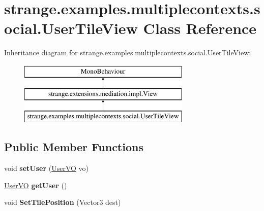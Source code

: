 \hypertarget{classstrange_1_1examples_1_1multiplecontexts_1_1social_1_1_user_tile_view}{\section{strange.\-examples.\-multiplecontexts.\-social.\-User\-Tile\-View Class Reference}
\label{classstrange_1_1examples_1_1multiplecontexts_1_1social_1_1_user_tile_view}
}
Inheritance diagram for strange.\-examples.\-multiplecontexts.\-social.\-User\-Tile\-View\-:\begin{figure}[H]
\begin{center}
\leavevmode
\includegraphics[height=3.000000cm]{classstrange_1_1examples_1_1multiplecontexts_1_1social_1_1_user_tile_view}
\end{center}
\end{figure}
\subsection*{Public Member Functions}
\begin{DoxyCompactItemize}
\item 
\hypertarget{classstrange_1_1examples_1_1multiplecontexts_1_1social_1_1_user_tile_view_a2b9f5d6111e685d3c1da2ef00802ac31}{void {\bfseries set\-User} (\hyperlink{classstrange_1_1examples_1_1multiplecontexts_1_1social_1_1_user_v_o}{User\-V\-O} vo)}\label{classstrange_1_1examples_1_1multiplecontexts_1_1social_1_1_user_tile_view_a2b9f5d6111e685d3c1da2ef00802ac31}

\item 
\hypertarget{classstrange_1_1examples_1_1multiplecontexts_1_1social_1_1_user_tile_view_a10863cffb1e3b2a92e50fd1bc67a7620}{\hyperlink{classstrange_1_1examples_1_1multiplecontexts_1_1social_1_1_user_v_o}{User\-V\-O} {\bfseries get\-User} ()}\label{classstrange_1_1examples_1_1multiplecontexts_1_1social_1_1_user_tile_view_a10863cffb1e3b2a92e50fd1bc67a7620}

\item 
\hypertarget{classstrange_1_1examples_1_1multiplecontexts_1_1social_1_1_user_tile_view_aeaa997218a7ce130ab3ee121105b822c}{void {\bfseries Set\-Tile\-Position} (Vector3 dest)}\label{classstrange_1_1examples_1_1multiplecontexts_1_1social_1_1_user_tile_view_aeaa997218a7ce130ab3ee121105b822c}

\end{DoxyCompactItemize}
